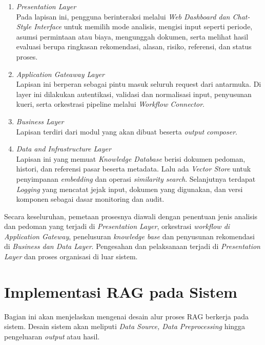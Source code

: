 \begin{enumerate} 
	\item \textit{Presentation Layer}\\ 
	Pada lapisan ini, pengguna berinteraksi melalui \textit{Web Dashboard dan Chat-Style Interface} untuk memilih mode analisis, mengisi input seperti periode, asumsi permintaan atau biaya, mengunggah dokumen, serta melihat hasil evaluasi berupa ringkasan rekomendasi, alasan, risiko, referensi, dan status proses. 
	\item \textit{Application Gateaway Layer}\\ 
	Lapisan ini berperan sebagai pintu masuk seluruh request dari antarmuka. Di layer ini dilakukan autentikasi, validasi dan normalisasi input, penyusunan kueri, serta orkestrasi pipeline melalui \textit{Workflow Connector}. 
	\item \textit{Business Layer}\\ 
	Lapisan terdiri dari modul yang akan dibuat beserta \textit{output composer}. 
	\item \textit{Data and Infrastructure Layer}\\ 
	Lapisan ini yang memuat \textit{Knowledge Database} berisi dokumen pedoman, histori, dan referensi pasar beserta metadata. Lalu ada \textit{Vector Store} untuk penyimpanan \textit{embedding} dan operasi \textit{similarity search}. Selanjutnya terdapat \textit{Logging} yang mencatat jejak input, dokumen yang digunakan, dan versi komponen sebagai dasar monitoring dan audit. 
\end{enumerate}

Secara keseluruhan, pemetaan prosesnya diawali dengan penentuan jenis analisis dan pedoman yang terjadi di \textit{Presentation Layer}, orkestrasi \textit{workflow di Application Gateway}, penelusuran \textit{knowledge base} dan penyusunan rekomendasi di \textit{Business dan Data Layer}. Pengesahan dan pelaksanaan terjadi di \textit{Presentation Layer} dan proses organisasi di luar sistem. 

\section{Implementasi RAG pada Sistem}

Bagian ini akan menjelaskan mengenai desain alur proses RAG berkerja pada sistem. Desain sistem akan meliputi \textit{Data Source, Data Preprocessing} hingga pengeluaran \textit{output} atau hasil.

